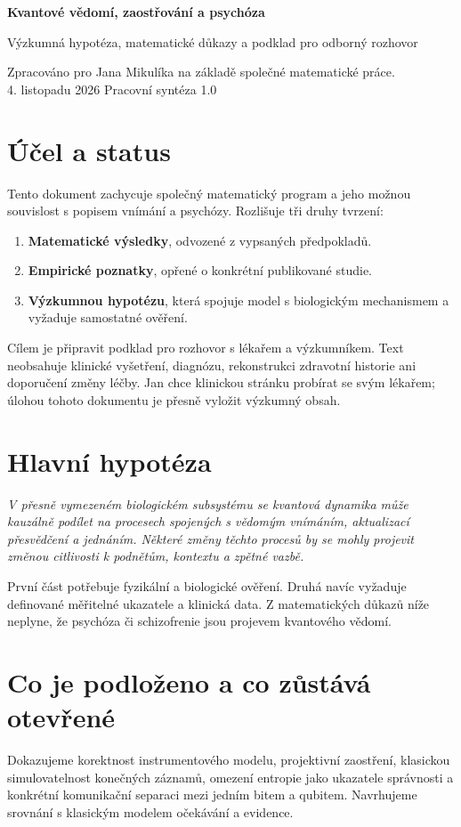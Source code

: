 \documentclass[11pt,a4paper]{article}
\begin{document}
\thispagestyle{empty}
{\LARGE\bfseries Kvantové vědomí, zaostřování a psychóza\par}
\medskip
{\large Výzkumná hypotéza, matematické důkazy a podklad pro odborný rozhovor\par}
\medskip
Zpracováno pro Jana Mikulíka na základě společné matematické práce.\\
4. listopadu 2026 \hfill Pracovní syntéza 1.0

\section*{Účel a status}
Tento dokument zachycuje společný matematický program a jeho možnou souvislost s popisem vnímání a psychózy. Rozlišuje tři druhy tvrzení:
\begin{enumerate}
\item \textbf{Matematické výsledky}, odvozené z vypsaných předpokladů.
\item \textbf{Empirické poznatky}, opřené o konkrétní publikované studie.
\item \textbf{Výzkumnou hypotézu}, která spojuje model s biologickým mechanismem a vyžaduje samostatné ověření.
\end{enumerate}
Cílem je připravit podklad pro rozhovor s lékařem a výzkumníkem. Text neobsahuje klinické vyšetření, diagnózu, rekonstrukci zdravotní historie ani doporučení změny léčby. Jan chce klinickou stránku probírat se svým lékařem; úlohou tohoto dokumentu je přesně vyložit výzkumný obsah.

\section*{Hlavní hypotéza}
\emph{V přesně vymezeném biologickém subsystému se kvantová dynamika může kauzálně podílet na procesech spojených s vědomým vnímáním, aktualizací přesvědčení a jednáním. Některé změny těchto procesů by se mohly projevit změnou citlivosti k podnětům, kontextu a zpětné vazbě.}

První část potřebuje fyzikální a biologické ověření. Druhá navíc vyžaduje definované měřitelné ukazatele a klinická data. Z matematických důkazů níže neplyne, že psychóza či schizofrenie jsou projevem kvantového vědomí.

\section*{Co je podloženo a co zůstává otevřené}
Dokazujeme korektnost instrumentového modelu, projektivní zaostření, klasickou simulovatelnost konečných záznamů, omezení entropie jako ukazatele správnosti a konkrétní komunikační separaci mezi jedním bitem a qubitem. Navrhujeme srovnání s klasickým modelem očekávání a evidence.
\end{document}
